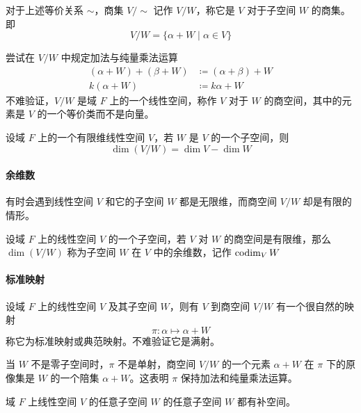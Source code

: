 对于上述等价关系 $\sim$，商集 $V/\sim$ 记作 $V/W$，称它是 $V$ 对于子空间 $W$ 的商集。即
\[ V/W = \{ \alpha + W \mid \alpha \in V \} \]

尝试在 $V/W$ 中规定加法与纯量乘法运算
\begin{equation*}
    \begin{aligned}
        (\alpha + W) + (\beta + W) &\coloneqq (\alpha + \beta) + W\\
        k(\alpha + W) &\coloneqq k\alpha + W
    \end{aligned}
\end{equation*}
不难验证，$V/W$ 是域 $F$ 上的一个线性空间，称作 $V$ 对于 $W$ 的商空间，其中的元素是 $V$ 的一个等价类而不是向量。

\begin{theorem}
    设域 $F$ 上的一个有限维线性空间 $V$，若 $W$ 是 $V$ 的一个子空间，则
    \[ \dim(V/W) = \dim V - \dim W \]
\end{theorem}

\paragraph{余维数}

有时会遇到线性空间 $V$ 和它的子空间 $W$ 都是无限维，而商空间 $V/W$ 却是有限的情形。

\begin{definition}[余维数]
    设域 $F$ 上的线性空间 $V$ 的一个子空间，若 $V$ 对 $W$ 的商空间是有限维，那么 $\dim(V/W)$ 称为子空间 $W$ 在 $V$ 中的余维数，记作 $\operatorname{codim}_V W$
\end{definition}

\paragraph{标准映射}

设域 $F$ 上的线性空间 $V$ 及其子空间 $W$，则有 $V$ 到商空间 $V/W$ 有一个很自然的映射
\[ \pi : \alpha \mapsto \alpha + W \]
称它为标准映射或典范映射。不难验证它是满射。

当 $W$ 不是零子空间时，$\pi$ 不是单射，商空间 $V/W$ 的一个元素 $\alpha + W$ 在 $\pi$ 下的原像集是 $W$ 的一个陪集 $\alpha + W$。这表明 $\pi$ 保持加法和纯量乘法运算。

\begin{theorem}
    域 $F$ 上线性空间 $V$ 的任意子空间 $W$ 的任意子空间 $W$ 都有补空间。
\end{theorem}


